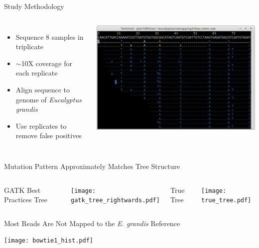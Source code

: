 \documentclass{beamer}
\begin{document}
\begin{frame}{Study Methodology}
\begin{columns}

\begin{itemize}
\item Sequence 8 samples in triplicate
\item $\sim$10X coverage for each replicate
\item Align sequence to genome of \textit{Eucalyptus grandis}
\item Use replicates to remove false positives
\end{itemize}

\includegraphics[width=\linewidth]{coverage.png}
\end{columns}
\end{frame}

\begin{frame}{Mutation Pattern Approximately Matches Tree Structure}
\begin{columns}
	\begin{center}
	GATK Best Practices Tree
	\end{center}
	\texttt{[image: gatk\_tree\_rightwards.pdf]}
	\begin{center}
	True Tree
	\end{center}
	\texttt{[image: true\_tree.pdf]}
\end{columns}
\end{frame}

\begin{frame}{Most Reads Are Not Mapped to the \textit{E. grandis} Reference}
\begin{center}
\texttt{[image: bowtie1\_hist.pdf]}
\end{center}
\end{frame}
\end{document}
